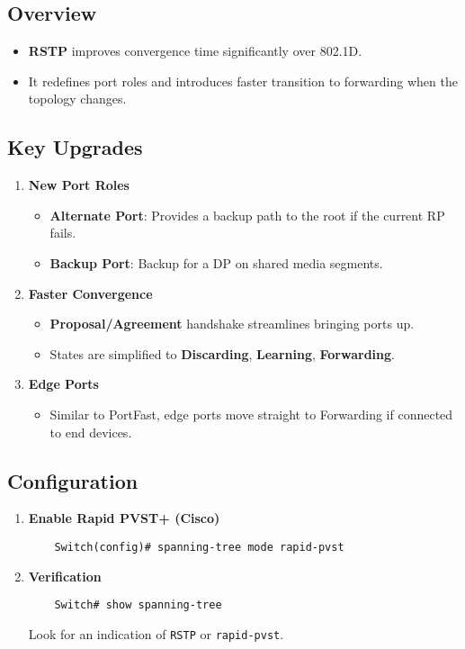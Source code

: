 \documentclass[a4paper]{report}
\begin{document}
\subsection{Overview}
\begin{itemize}
    \item \textbf{RSTP} improves convergence time significantly over 802.1D.
    \item It redefines port roles and introduces faster transition to forwarding when the topology changes.
\end{itemize}

\subsection{Key Upgrades}
\begin{enumerate}
    \item \textbf{New Port Roles}
    \begin{itemize}
        \item \textbf{Alternate Port}: Provides a backup path to the root if the current RP fails.
        \item \textbf{Backup Port}: Backup for a DP on shared media segments.
    \end{itemize}
    \item \textbf{Faster Convergence}
    \begin{itemize}
        \item \textbf{Proposal/Agreement} handshake streamlines bringing ports up.
        \item States are simplified to \textbf{Discarding}, \textbf{Learning}, \textbf{Forwarding}.
    \end{itemize}
    \item \textbf{Edge Ports}
    \begin{itemize}
        \item Similar to PortFast, edge ports move straight to Forwarding if connected to end devices.
    \end{itemize}
\end{enumerate}

\subsection{Configuration}
\begin{enumerate}
    \item \textbf{Enable Rapid PVST+ (Cisco)}
    \begin{lstlisting}
    Switch(config)# spanning-tree mode rapid-pvst
    \end{lstlisting}
    \item \textbf{Verification}
    \begin{lstlisting}
    Switch# show spanning-tree
    \end{lstlisting}
    Look for an indication of \texttt{RSTP} or \texttt{rapid-pvst}.
\end{enumerate}
\end{document}
